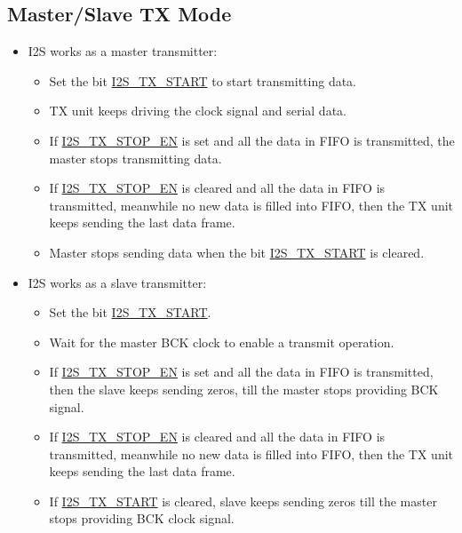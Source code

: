 \documentclass[main\_\_CN.tex]{subfiles}
\begin{document}
\subsection{Master/Slave TX Mode} \label{subsubsection:master/slave_transmitting_mode}
\begin{itemize}
    \item I2S works as a master transmitter:
    \begin{itemize}
        \item Set the bit  \hyperref[fielddesc:I2STXSTART]{I2S\_TX\_START} to start transmitting data.
        \item TX unit keeps driving the clock signal and serial data.
        \item If  \hyperref[fielddesc:I2STXSTOPEN]{I2S\_TX\_STOP\_EN} is set and all the data in FIFO is transmitted, the master stops transmitting data.
        \item If  \hyperref[fielddesc:I2STXSTOPEN]{I2S\_TX\_STOP\_EN} is cleared and all the data in FIFO is transmitted, meanwhile no new data is filled into FIFO, then the TX unit keeps sending the last data frame.
        \item Master stops sending data when the bit  \hyperref[fielddesc:I2STXSTART]{I2S\_TX\_START} is cleared.
    \end{itemize}
    \item I2S works as a slave transmitter:
     \begin{itemize}
        \item Set the bit  \hyperref[fielddesc:I2STXSTART]{I2S\_TX\_START}.
        \item Wait for the master BCK clock to enable a transmit operation.
        \item If  \hyperref[fielddesc:I2STXSTOPEN]{I2S\_TX\_STOP\_EN} is set and all the data in FIFO is transmitted, then the slave keeps sending zeros, till the master stops providing BCK signal.
        \item If  \hyperref[fielddesc:I2STXSTOPEN]{I2S\_TX\_STOP\_EN} is cleared and all the data in FIFO is transmitted, meanwhile no new data is filled into FIFO, then the TX unit keeps sending the last data frame.
        \item If  \hyperref[fielddesc:I2STXSTART]{I2S\_TX\_START} is cleared, slave keeps sending zeros till the master stops providing BCK clock signal.
    \end{itemize}
\end{itemize}
\end{document}
